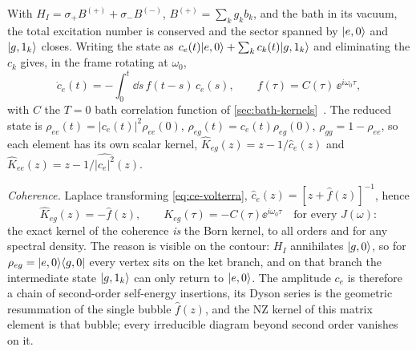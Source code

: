 \begin{exbox}
With $H_I=\sigma_+B^{(+)}+\sigma_-B^{(-)}$, $B^{(+)}=\sum_kg_kb_k$, and the bath in its vacuum, the total excitation number is conserved and the sector spanned by $|e,0\rangle$ and $|g,1_k\rangle$ closes.
Writing the state as $c_e(t)|e,0\rangle+\sum_kc_k(t)|g,1_k\rangle$ and eliminating the $c_k$ gives, in the frame rotating at $\omega_0$,
\begin{equation}
  \dot c_e(t)=-\int_0^t\!\dd s\,f(t-s)\,c_e(s),\qquad f(\tau)=C(\tau)\,\ee^{i\omega_0\tau},
  \label{eq:ce-volterra}
\end{equation}
with $C$ the $T=0$ bath correlation function of \cref{sec:bath-kernels}~\cite[Sec.~10.1]{BreuerPetruccione}.
The reduced state is $\rho_{ee}(t)=|c_e(t)|^2\rho_{ee}(0)$, $\rho_{eg}(t)=c_e(t)\rho_{eg}(0)$, $\rho_{gg}=1-\rho_{ee}$, so each element has its own scalar kernel, $\hat K_{eg}(z)=z-1/\hat c_e(z)$ and $\hat K_{ee}(z)=z-1/\widehat{|c_e|^2}(z)$.

\smallskip\noindent\emph{Coherence.}
Laplace transforming \cref{eq:ce-volterra}, $\hat c_e(z)=[z+\hat f(z)]^{-1}$, hence
\begin{equation}
  \hat K_{eg}(z)=-\hat f(z),\qquad K_{eg}(\tau)=-C(\tau)\ee^{i\omega_0\tau}\quad\text{for every }J(\omega):
  \label{eq:Keg-exact}
\end{equation}
the exact kernel of the coherence \emph{is} the Born kernel, to all orders and for any spectral density.
The reason is visible on the contour: $H_I$ annihilates $|g,0\rangle$, so for $\rho_{eg}=|e,0\rangle\langle g,0|$ every vertex sits on the ket branch, and on that branch the intermediate state $|g,1_k\rangle$ can only return to $|e,0\rangle$.
The amplitude $c_e$ is therefore a chain of second-order self-energy insertions, its Dyson series is the geometric resummation of the single bubble $\hat f(z)$, and the NZ kernel of this matrix element is that bubble; every irreducible diagram beyond second order vanishes on it.


\end{exbox}
